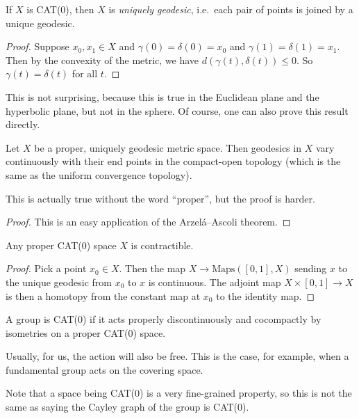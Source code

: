 \documentclass[a4paper]{article}
\begin{document}
\begin{lemma}
  If $X$ is CAT(0), then $X$ is \emph{uniquely geodesic}, i.e.\ each pair of points is joined by a unique geodesic.
\end{lemma}

\begin{proof}
  Suppose $x_0, x_1 \in X$ and $\gamma(0) = \delta(0) = x_0$ and $\gamma(1) = \delta(1) = x_1$. Then by the convexity of the metric, we have $d(\gamma(t), \delta(t)) \leq 0$. So $\gamma(t) = \delta(t)$ for all $t$.
\end{proof}
This is not surprising, because this is true in the Euclidean plane and the hyperbolic plane, but not in the sphere. Of course, one can also prove this result directly.

\begin{lemma}
  Let $X$ be a proper, uniquely geodesic metric space. Then geodesics in $X$ vary continuously with their end points in the compact-open topology (which is the same as the uniform convergence topology).
\end{lemma}
This is actually true without the word ``proper'', but the proof is harder.

\begin{proof}
  This is an easy application of the Arzel\'a--Ascoli theorem.
\end{proof}

\begin{prop}
  Any proper CAT(0) space $X$ is contractible.
\end{prop}

\begin{proof}
  Pick a point $x_0 \in X$. Then the map $X \to \mathrm{Maps}([0, 1], X)$ sending $x$ to the unique geodesic from $x_0$ to $x$ is continuous. The adjoint map $X \times [0, 1] \to X$ is then a homotopy from the constant map at $x_0$ to the identity map.
\end{proof}

\begin{defi}
  A group is CAT(0) if it acts properly discontinuously and cocompactly by isometries on a proper CAT(0) space.
\end{defi}
Usually, for us, the action will also be free. This is the case, for example, when a fundamental group acts on the covering space.

Note that a space being CAT(0) is a very fine-grained property, so this is not the same as saying the Cayley graph of the group is CAT(0).
\end{document}
